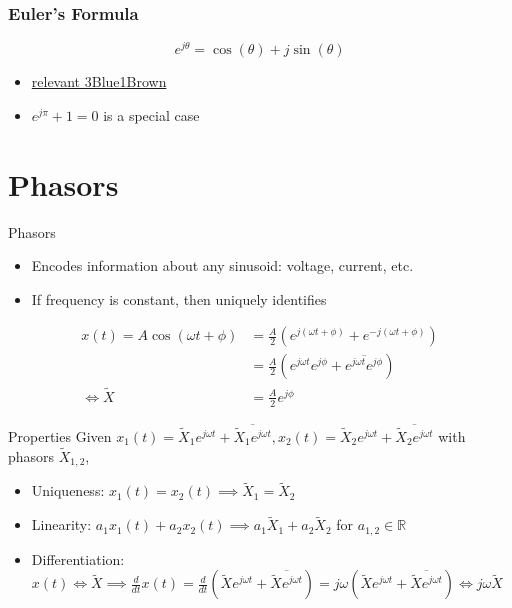 \documentclass[aspectratio=169]{beamer}
\begin{document}
\begin{frame}
    \frametitle{Euler's Formula}

    \begin{equation}
        e^{j \theta} = \cos(\theta) + j \sin(\theta)
    \end{equation}
    \begin{itemize}
        \item \href{https://youtu.be/v0YEaeIClKY}{relevant 3Blue1Brown}
        \item \(e^{j \pi} + 1 = 0\) is a special case
    \end{itemize}
\end{frame}

\section{Phasors}

\begin{frame}{Phasors}
    \begin{itemize}
        \item Encodes information about any sinusoid: voltage, current, etc.
        \item If frequency is constant, then uniquely identifies
    \end{itemize}
    \begin{align}
        x(t) = A \cos(\omega t + \phi) &= \frac{A}{2} \left(e^{j (\omega t + \phi)} + e^{-j (\omega t + \phi)}\right) \\
        &= \frac{A}{2} \left(e^{j \omega t} e^{j \phi} + \overline{e^{j \omega t} e^{j \phi}}\right) \\
        \iff \widetilde{X} &= \frac{A}{2} e^{j \phi}
    \end{align}
\end{frame}

\begin{frame}{Properties}
    Given \(x_1(t) = \widetilde{X}_1 e^{j \omega t} + \overline{\widetilde{X}_1 e^{j \omega t}}, x_2(t) = \widetilde{X}_2 e^{j \omega t} + \overline{\widetilde{X}_2 e^{j \omega t}}\) with phasors \(\widetilde{X}_{1, 2}\),
    \begin{itemize}
        \item Uniqueness: \(x_1(t) = x_2(t) \implies \widetilde{X}_1 = \widetilde{X}_2\)
        \item Linearity: \(a_1 x_1(t) + a_2 x_2(t) \implies a_1 \widetilde{X}_1 + a_2 \widetilde{X}_2\) for \(a_{1, 2} \in \mathbb{R}\)
        \item Differentiation: \(x(t) \iff \widetilde{X} \implies \frac{d}{dt} x(t) = \frac{d}{dt} \left(\widetilde{X} e^{j \omega t} + \overline{\widetilde{X} e^{j \omega t}}\right) = j \omega \left(\widetilde{X} e^{j \omega t} + \overline{\widetilde{X} e^{j \omega t}}\right) \iff j \omega \widetilde{X}\)
    \end{itemize}
\end{frame}
\end{document}
